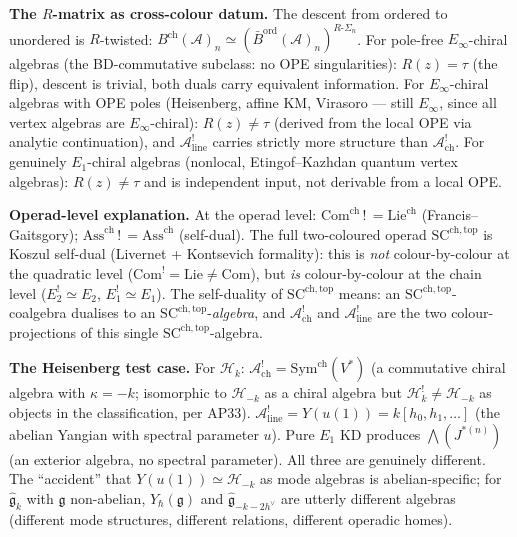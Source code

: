 \documentclass[11pt]{article}
\newcommand{\cA}{\mathcal{A}}
\newcommand{\cH}{\mathcal{H}}
\newcommand{\fg}{\mathfrak{g}}
\begin{document}
\medskip\noindent\textbf{The $R$-matrix as cross-colour datum.}\enspace
The descent from ordered to unordered is $R$-twisted:
$B^{\mathrm{ch}}(\cA)_n \simeq
(\bar{B}^{\mathrm{ord}}(\cA)_n)^{R\text{-}\Sigma_n}$.
For pole-free $E_\infty$-chiral algebras (the
BD-commutative subclass: no OPE singularities):
$R(z) = \tau$ (the flip), descent is trivial, both
duals carry equivalent information.  For
$E_\infty$-chiral algebras with OPE poles
(Heisenberg, affine KM, Virasoro --- still $E_\infty$,
since all vertex algebras are $E_\infty$-chiral):
$R(z) \neq \tau$ (derived from the local OPE via
analytic continuation), and $\cA^!_{\mathrm{line}}$
carries strictly more structure than
$\cA^!_{\mathrm{ch}}$.  For genuinely $E_1$-chiral
algebras (nonlocal, Etingof--Kazhdan quantum vertex
algebras): $R(z) \neq \tau$ and is independent
input, not derivable from a local OPE.

\medskip\noindent\textbf{Operad-level explanation.}\enspace
At the operad level:
$\mathrm{Com}^{\mathrm{ch}} \,!\, = \mathrm{Lie}^{\mathrm{ch}}$
(Francis--Gaitsgory);
$\mathrm{Ass}^{\mathrm{ch}} \,!\, = \mathrm{Ass}^{\mathrm{ch}}$
(self-dual).  The full two-coloured operad
$\mathrm{SC}^{\mathrm{ch,top}}$ is Koszul self-dual
(Livernet + Kontsevich formality): this is \emph{not}
colour-by-colour at the quadratic level
($\mathrm{Com}^! = \mathrm{Lie} \neq \mathrm{Com}$), but
\emph{is} colour-by-colour at the chain level
($E_2^! \simeq E_2$, $E_1^! \simeq E_1$).  The self-duality
of $\mathrm{SC}^{\mathrm{ch,top}}$ means: an
$\mathrm{SC}^{\mathrm{ch,top}}$-coalgebra dualises to an
$\mathrm{SC}^{\mathrm{ch,top}}$-\emph{algebra}, and
$\cA^!_{\mathrm{ch}}$ and $\cA^!_{\mathrm{line}}$ are the
two colour-projections of this single
$\mathrm{SC}^{\mathrm{ch,top}}$-algebra.

\medskip\noindent\textbf{The Heisenberg test case.}\enspace
For $\cH_k$: $\cA^!_{\mathrm{ch}} = \mathrm{Sym}^{\mathrm{ch}}(V^*)$
(a commutative chiral algebra with $\kappa = -k$;
isomorphic to $\cH_{-k}$ as a chiral algebra but
$\cH_k^! \neq \cH_{-k}$ as objects in the classification,
per AP33).  $\cA^!_{\mathrm{line}} = Y(u(1)) = k[h_0, h_1, \ldots]$
(the abelian Yangian with spectral parameter $u$).
Pure $E_1$ KD produces $\bigwedge(J^{*(n)})$ (an exterior algebra,
no spectral parameter).  All three are genuinely different.
The ``accident'' that $Y(u(1)) \simeq \cH_{-k}$ as mode algebras
is abelian-specific; for $\widehat{\fg}_k$ with $\fg$ non-abelian,
$Y_\hbar(\fg)$ and $\widehat{\fg}_{-k-2h^\vee}$ are utterly
different algebras (different mode structures, different relations,
different operadic homes).
\end{document}
